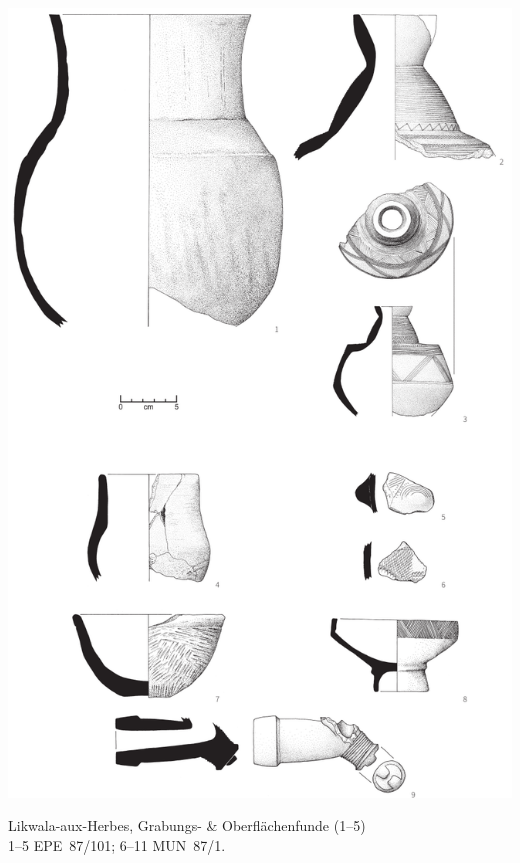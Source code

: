\begin{pl}[H]
	\includegraphics{plt/Taf88.pdf}
	\vspace{.75em}\caption{Likwala-aux-Herbes, Grabungs- \& Oberflächenfunde (1--5) \\ 1--5 EPE~87/101; 6--11 MUN~87/1.}
	\label{pl:88}
\end{pl}

